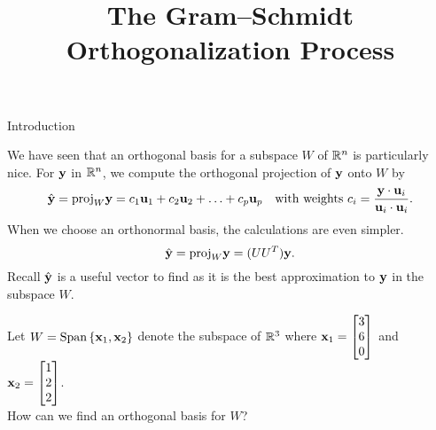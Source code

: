 \documentclass[xcolor=dvipsnames,aspectratio=169,t]{beamer}
\title{The Gram--Schmidt Orthogonalization Process}
\begin{document}
\maketitle

\begin{frame}{Introduction}
  \smallskip

  \bi
  \ii We have seen that an orthogonal basis for a subspace $W$ of $\mathbb{R}^n$ is particularly nice.\smallskip
  \bi
  \ii For $\mathbf{y}$ in $\mathbb{R}^n$, we compute the \alert{orthogonal projection} of $\mathbf{y}$ onto $W$ by
  \[ \hat{\mathbf{y}} = \mbox{proj}_W \mathbf{y} = c_1 \mathbf{u}_1 + c_2 \mathbf{u}_2 + \ldots + c_p \mathbf{u}_p \quad \mbox{with weights} \ c_i = \frac{\mathbf{y} \cdot \mathbf{u}_i}{\mathbf{u}_i \cdot \mathbf{u}_i} .\]
  \ei
  \ii When we choose an \alert{orthonormal basis}, the calculations are even simpler.
  \[ \hat{\mathbf{y}} = \mbox{proj}_W \mathbf{y} = (UU^T) \mathbf{y} .\]
  \vspace*{-1em}
  \ii Recall $\hat{\mathbf{y}}$ is a useful vector to find as it is the \alert{best approximation} to $\mathbf{y}$ in the subspace $W$.
  \ei

  \pause
  \begin{example}
    Let $W  = \mbox{Span} \left\{ \mathbf{x}_1 , \mathbf{x}_2 \right\}$ denote the subspace of $\mathbb{R}^3$ where $\mathbf{x}_1 = \begin{bmatrix} 3 \\ 6 \\ 0 \end{bmatrix}$ and $\mathbf{x}_2 = \begin{bmatrix} 1 \\ 2 \\ 2 \end{bmatrix}$. \\
    How can we find an \alert{orthogonal basis} for $W$?
  \end{example}
\end{frame}
\end{document}
